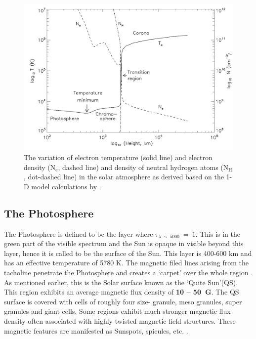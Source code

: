 \begin{figure}[ht!]
    \centering
    \includegraphics[width = 0.8\linewidth]{Figures/solar_atm.png}
    \caption{The variation of electron temperature (solid line) and electron density ($\mathrm{N_{e}}$, dashed line) and density of neutral hydrogen atoms ($\mathrm{N_{H}}$, dot-dashed line) in the solar atmosphere as derived based on the 1-D model calculations by .}
    \label{fig_solar_atm}
\end{figure}

\subsection{The Photosphere}\label{photosphere}

The Photosphere is defined to be the layer where $\tau_{\lambda~\sim~5000}~=~1$. This is in the green part of the visible spectrum and the Sun is opaque in visible beyond this layer, hence it is called to be the surface of the Sun. This layer is 400-600 km  and has an effective temperature of 5780 K. The magnetic filed lines arising from the tacholine penetrate the Photosphere and creates a `carpet' over the whole region \citep{priest14}. As mentioned earlier, this is the Solar surface known as the `Quite Sun'(QS). This region exhibits an average magnetic flux density of \textbf{10 -- 50~G}. The QS surface is covered with cells of roughly four size- granule, meso granules, super granules and giant cells. Some regions exhibit much stronger magnetic flux density often associated with highly twisted magnetic field structures. These magnetic features are manifested as Sunspots, spicules,  etc.  \citep{solanki93,grossman96,rubio19}.

